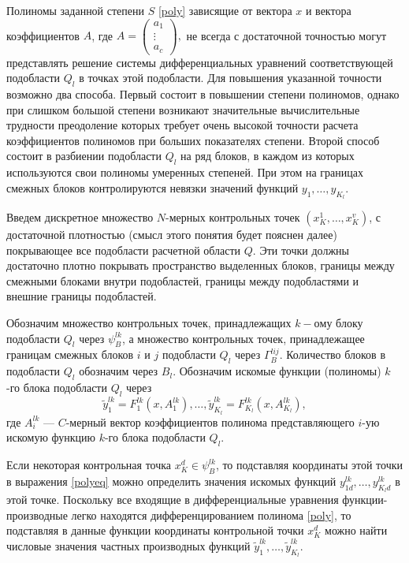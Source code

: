 \documentclass[a4paper,11pt,numreferences,mathsec,kaplist]{isuepsutf8}
\begin{document}
\begin{article}
Полиномы заданной степени $S$ \eqref{poly} зависящие от вектора $x$ и
вектора коэффициентов $A$, где $A=\left(\begin{matrix}a_1\\\vdots\\
a_c\end{matrix}\right),$ не всегда с достаточной точностью могут
представлять решение системы дифференциальных уравнений соответствующей
подобласти $Q_l$ в точках этой подобласти. Для повышения указанной
точности возможно два способа.  Первый состоит в повышении степени
полиномов, однако при слишком большой степени возникают значительные
вычислительные трудности преодоление которых требует очень высокой
точности расчета коэффициентов полиномов при больших показателях
степени. Второй способ состоит в разбиении подобласти $Q_l$ на ряд
блоков, в каждом из которых используются свои полиномы умеренных
степеней. При этом на границах смежных блоков контролируются невязки
значений функций $y_1,\ldots,y_{K_l}$.

Введем дискретное множество $N$-мерных контрольных точек
$(x^1_K,\ldots,x^v_K)$, с достаточной плотностью (смысл этого понятия
будет пояснен далее) покрывающее все подобласти расчетной области $Q$.
Эти точки должны достаточно плотно покрывать пространство выделенных
блоков, границы между смежными блоками внутри подобластей, границы между
подобластями и внешние границы подобластей. 

Обозначим множество контрольных точек, принадлежащих $k-ому$ блоку 
подобласти $Q_l$ через $\psi^{lk}_B$, а множество контрольных точек,
принадлежащее границам смежных блоков $i$ и $j$ подобласти $Q_l$ через
$\Gamma^{lij}_B$. Количество блоков в подобласти $Q_l$ обозначим через
$B_l$. Обозначим искомые функции (полиномы) $k$-го блока подобласти
$Q_l$ через 
\begin{equation}
    \tilde{y}^{lk}_1 = F^{lk}_1(x,A^{lk}_1), \ldots,
    \tilde{y}^{lk}_{K_l} = F^{lk}_{K_l}(x,A^{lk}_{K_l}),
    \label{polyeq}
\end{equation}
где $A^{lk}_i$ --- $C$-мерный вектор коэффициентов полинома представляющего
$i$-ую искомую функцию $k$-го блока подобласти $Q_l$.

Если некоторая контрольная точка $x^d_K \in \psi^{lk}_B$, то подставляя
координаты этой точки в выражения \eqref{polyeq} можно определить
значения искомых функций $y^{lk}_{1d},\ldots,y^{lk}_{K_ld}$ в этой точке.
Поскольку все входящие в дифференциальные уравнения
функции-производные легко находятся дифференцированием полинома
\eqref{poly}, то подставляя в данные функции координаты контрольной
точки $x^d_K$ можно найти числовые значения частных производных
функций $\tilde{y}^{lk}_1, \ldots, \tilde{y}^{lk}_{K_l}$.


\end{article}
\end{document}
